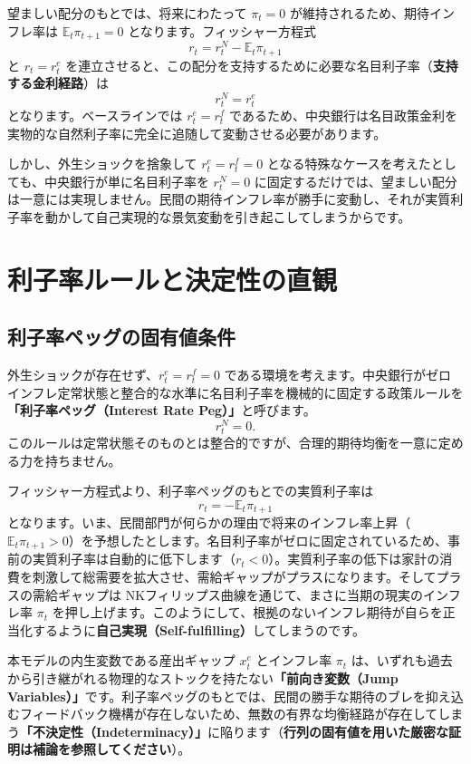 \documentclass[
  japanese,
  lualatex,
  ja=standard,
  12pt,
  a4paper]{ltjsarticle}
\begin{document}
望ましい配分のもとでは、将来にわたって \(\pi_t=0\)
が維持されるため、期待インフレ率は \(\mathbb{E}_t\pi_{t+1}=0\)
となります。フィッシャー方程式 \[
r_t=r_t^N-\mathbb{E}_t\pi_{t+1}
\] と \(r_t=r_t^e\)
を連立させると、この配分を支持するために必要な名目利子率（\textbf{支持する金利経路}）は
\[
r_t^N=r_t^e
\] となります。ベースラインでは \(r_t^e=r_t^f\)
であるため、中央銀行は名目政策金利を実物的な自然利子率に完全に追随して変動させる必要があります。

しかし、外生ショックを捨象して \(r_t^e=r_t^f=0\)
となる特殊なケースを考えたとしても、中央銀行が単に名目利子率を
\(r_t^N=0\)
に固定するだけでは、望ましい配分は一意には実現しません。民間の期待インフレ率が勝手に変動し、それが実質利子率を動かして自己実現的な景気変動を引き起こしてしまうからです。

\section{利子率ルールと決定性の直観}\label{ux5229ux5b50ux7387ux30ebux30fcux30ebux3068ux6c7aux5b9aux6027ux306eux76f4ux89b3}

\subsection{利子率ペッグの固有値条件}\label{ux5229ux5b50ux7387ux30daux30c3ux30b0ux306eux56faux6709ux5024ux6761ux4ef6}

外生ショックが存在せず、\(r_t^e=r_t^f=0\)
である環境を考えます。中央銀行がゼロインフレ定常状態と整合的な水準に名目利子率を機械的に固定する政策ルールを\textbf{「利子率ペッグ（Interest
Rate Peg）」}と呼びます。 \[
r_t^N=0.
\]
このルールは定常状態そのものとは整合的ですが、合理的期待均衡を一意に定める力を持ちません。

フィッシャー方程式より、利子率ペッグのもとでの実質利子率は \[
r_t=-\mathbb{E}_t\pi_{t+1}
\]
となります。いま、民間部門が何らかの理由で将来のインフレ率上昇（\(\mathbb{E}_t\pi_{t+1}>0\)）を予想したとします。名目利子率がゼロに固定されているため、事前の実質利子率は自動的に低下します（\(r_t<0\)）。実質利子率の低下は家計の消費を刺激して総需要を拡大させ、需給ギャップがプラスになります。そしてプラスの需給ギャップは
NKフィリップス曲線を通じて、まさに当期の現実のインフレ率 \(\pi_t\)
を押し上げます。このようにして、根拠のないインフレ期待が自らを正当化するように\textbf{自己実現（Self-fulfilling）}してしまうのです。

本モデルの内生変数である産出ギャップ \(x_t^e\) とインフレ率 \(\pi_t\)
は、いずれも過去から引き継がれる物理的なストックを持たない\textbf{「前向き変数（Jump
Variables）」}です。利子率ペッグのもとでは、民間の勝手な期待のブレを抑え込むフィードバック機構が存在しないため、無数の有界な均衡経路が存在してしまう\textbf{「不決定性（Indeterminacy）」}に陥ります（\textbf{行列の固有値を用いた厳密な証明は補論を参照してください}）。
\end{document}
